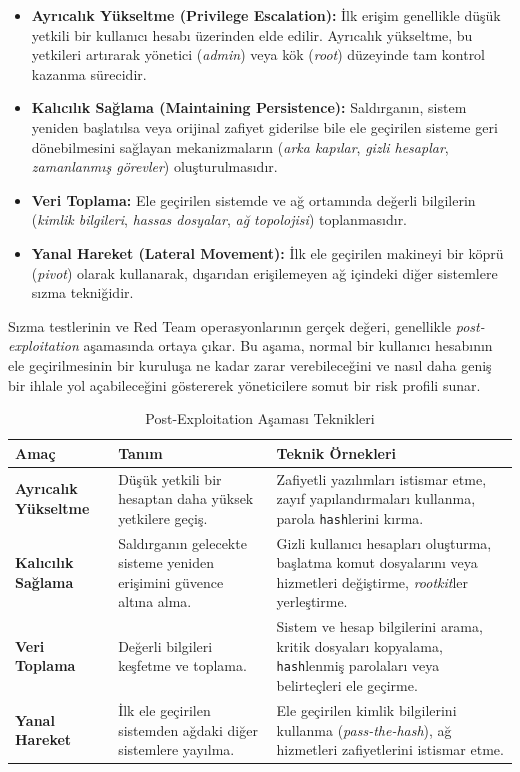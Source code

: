 \begin{itemize}
\item \textbf{Ayrıcalık Yükseltme (Privilege Escalation):} İlk erişim genellikle düşük yetkili bir kullanıcı hesabı üzerinden elde edilir. Ayrıcalık yükseltme, bu yetkileri artırarak yönetici (\textit{admin}) veya kök (\textit{root}) düzeyinde tam kontrol kazanma sürecidir.
\item \textbf{Kalıcılık Sağlama (Maintaining Persistence):} Saldırganın, sistem yeniden başlatılsa veya orijinal zafiyet giderilse bile ele geçirilen sisteme geri dönebilmesini sağlayan mekanizmaların (\textit{arka kapılar}, \textit{gizli hesaplar}, \textit{zamanlanmış görevler}) oluşturulmasıdır.
\item \textbf{Veri Toplama:} Ele geçirilen sistemde ve ağ ortamında değerli bilgilerin (\textit{kimlik bilgileri}, \textit{hassas dosyalar}, \textit{ağ topolojisi}) toplanmasıdır.
\item \textbf{Yanal Hareket (Lateral Movement):} İlk ele geçirilen makineyi bir köprü (\textit{pivot}) olarak kullanarak, dışarıdan erişilemeyen ağ içindeki diğer sistemlere sızma tekniğidir.
\end{itemize}

Sızma testlerinin ve Red Team operasyonlarının gerçek değeri, genellikle \textit{post-exploitation} aşamasında ortaya çıkar. Bu aşama, normal bir kullanıcı hesabının ele geçirilmesinin bir kuruluşa ne kadar zarar verebileceğini ve nasıl daha geniş bir ihlale yol açabileceğini göstererek yöneticilere somut bir risk profili sunar.

\begin{table}[h]
\centering
\caption{Post-Exploitation Aşaması Teknikleri}
\begin{tabularx}{\textwidth}{|X|X|X|}
\hline
\textbf{Amaç} & \textbf{Tanım} & \textbf{Teknik Örnekleri} \\
\hline
\textbf{Ayrıcalık Yükseltme} & Düşük yetkili bir hesaptan daha yüksek yetkilere geçiş. & Zafiyetli yazılımları istismar etme, zayıf yapılandırmaları kullanma, parola \texttt{hash}lerini kırma. \\
\hline
\textbf{Kalıcılık Sağlama} & Saldırganın gelecekte sisteme yeniden erişimini güvence altına alma. & Gizli kullanıcı hesapları oluşturma, başlatma komut dosyalarını veya hizmetleri değiştirme, \textit{rootkit}ler yerleştirme. \\
\hline
\textbf{Veri Toplama} & Değerli bilgileri keşfetme ve toplama. & Sistem ve hesap bilgilerini arama, kritik dosyaları kopyalama, \texttt{hash}lenmiş parolaları veya belirteçleri ele geçirme. \\
\hline
\textbf{Yanal Hareket} & İlk ele geçirilen sistemden ağdaki diğer sistemlere yayılma. & Ele geçirilen kimlik bilgilerini kullanma (\textit{pass-the-hash}), ağ hizmetleri zafiyetlerini istismar etme. \\
\hline
\end{tabularx}
\end{table}

